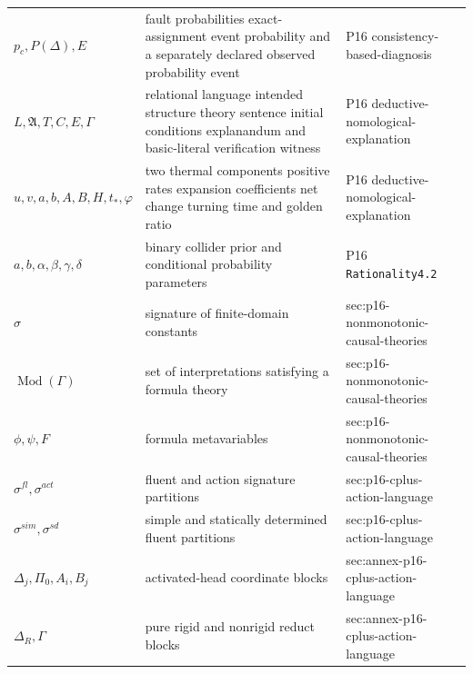 \begin{longtable}{@{}p{}p{}p{}@{}}
\(p_c,\allowbreak P(\Delta),\allowbreak E\) & fault probabilities exact-assignment event probability and a separately declared observed probability event & P16 consistency-\allowbreak{}based-\allowbreak{}diagnosis \\
\(L,\allowbreak \mathfrak A,\allowbreak T,\allowbreak C,\allowbreak E,\allowbreak \Gamma\) & relational language intended structure theory sentence initial conditions explanandum and basic-literal verification witness & P16 deductive-\allowbreak{}nomological-\allowbreak{}explanation \\
\(u,\allowbreak v,\allowbreak a,\allowbreak b,\allowbreak A,\allowbreak B,\allowbreak H,\allowbreak t_*,\allowbreak \varphi\) & two thermal components positive rates expansion coefficients net change turning time and golden ratio & P16 deductive-\allowbreak{}nomological-\allowbreak{}explanation \\
\(a,\allowbreak b,\allowbreak \alpha,\allowbreak \beta,\allowbreak \gamma,\allowbreak \delta\) & binary collider prior and conditional probability parameters & P16 \texttt{Rationality4.\allowbreak{}2} \\
\(\sigma\) & signature of finite-domain constants & sec:\allowbreak{}p16-\allowbreak{}nonmonotonic-\allowbreak{}causal-\allowbreak{}theories \\
\(\operatorname{Mod}(\Gamma)\) & set of interpretations satisfying a formula theory & sec:\allowbreak{}p16-\allowbreak{}nonmonotonic-\allowbreak{}causal-\allowbreak{}theories \\
\(\phi,\allowbreak \psi,\allowbreak F\) & formula metavariables & sec:\allowbreak{}p16-\allowbreak{}nonmonotonic-\allowbreak{}causal-\allowbreak{}theories \\
\(\sigma^{fl},\allowbreak \sigma^{act}\) & fluent and action signature partitions & sec:\allowbreak{}p16-\allowbreak{}cplus-\allowbreak{}action-\allowbreak{}language \\
\(\sigma^{sim},\allowbreak \sigma^{sd}\) & simple and statically determined fluent partitions & sec:\allowbreak{}p16-\allowbreak{}cplus-\allowbreak{}action-\allowbreak{}language \\
\(\Delta_j,\allowbreak \Pi_0,\allowbreak A_i,\allowbreak B_j\) & activated-head coordinate blocks & sec:\allowbreak{}annex-\allowbreak{}p16-\allowbreak{}cplus-\allowbreak{}action-\allowbreak{}language \\
\(\Delta_R,\allowbreak \Gamma\) & pure rigid and nonrigid reduct blocks & sec:\allowbreak{}annex-\allowbreak{}p16-\allowbreak{}cplus-\allowbreak{}action-\allowbreak{}language \\

\end{longtable}
